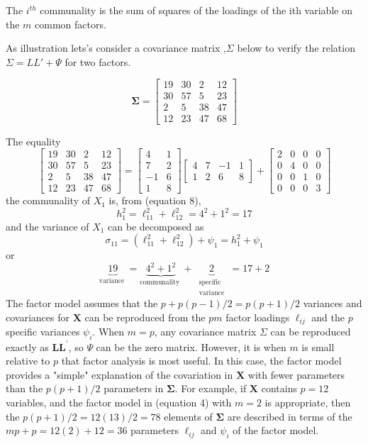 \documentclass[12pt]{article}
\begin{document}
\noindent The $i^{th}$ communality is the sum of squares of the loadings of the ith variable on the $m$ common factors.

As illustration lets's consider a covariance matrix ,$\Sigma$ below to verify the relation $\Sigma=LL' + \Psi$ for two factors.

$$
\mathbf{\Sigma}=\left[\begin{array}{rrrr}
	19 & 30 & 2 & 12 \\
	30 & 57 & 5 & 23 \\
	2 & 5 & 38 & 47 \\
	12 & 23 & 47 & 68
\end{array}\right]
$$

The equality
$$
\left[\begin{array}{rrrr}
	19 & 30 & 2 & 12 \\
	30 & 57 & 5 & 23 \\
	2 & 5 & 38 & 47 \\
	12 & 23 & 47 & 68
\end{array}\right]=\left[\begin{array}{rr}
	4 & 1 \\
	7 & 2 \\
	-1 & 6 \\
	1 & 8
\end{array}\right]\left[\begin{array}{rrrr}
	4 & 7 & -1 & 1 \\
	1 & 2 & 6 & 8
\end{array}\right]+\left[\begin{array}{llll}
	2 & 0 & 0 & 0 \\
	0 & 4 & 0 & 0 \\
	0 & 0 & 1 & 0 \\
	0 & 0 & 0 & 3
\end{array}\right]
$$
the communality of $X_1$ is, from (equation 8),
$$
h_1^2=\ell_{11}^2+\ell_{12}^2=4^2+1^2=17
$$
and the variance of $X_1$ can be decomposed as
$$
\sigma_{11}=\left(\ell_{11}^2+\ell_{12}^2\right)+\psi_1=h_1^2+\psi_1
$$
or
$$
\underbrace{19}_{\text {variance }}=\underbrace{4^2+1^2}_{\text {communality }}+\underbrace{2}_{\begin{array}{c}
		\text { specific } \\
		\text { variance }
\end{array}}=17+2
$$
\noindent The factor model assumes that the $p+p(p-1) / 2=p(p+1) / 2$ variances and covariances for $\mathbf{X}$ can be reproduced from the $p m$ factor loadings $\ell_{i j}$ and the $p$ specific variances $\psi_i$. When $m=p$, any covariance matrix $\Sigma$ can be reproduced exactly as $\mathbf{L} \mathbf{L}^{\prime}$, so $\Psi$ can be the zero matrix. However, it is when $m$ is small relative to $p$ that factor analysis is most useful. In this case, the factor model provides a "simple" explanation of the covariation in $\mathbf{X}$ with fewer parameters than the $p(p+1) / 2$ parameters in $\mathbf{\Sigma}$. For example, if $\mathbf{X}$ contains $p=12$ variables, and the factor model in (equation 4) with $m=2$ is appropriate, then the $p(p+1) / 2=12(13) / 2=78$ elements of $\mathbf{\Sigma}$ are described in terms of the $m p+p=12(2)+12=36$ parameters $\ell_{i j}$ and $\psi_i$ of the factor model.\\
\end{document}
